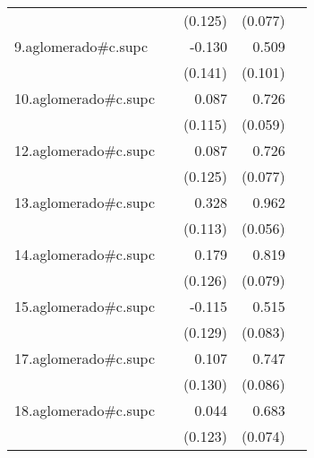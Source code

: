 {\begin{longtable}{l*{4}{D{.}{.}{-1}}}
            &                     &     (0.125)         &     (0.077)         &                     \\
\addlinespace
9.aglomerado#c.supc&                     &      -0.130         &       0.509\sym{***}&                     \\
            &                     &     (0.141)         &     (0.101)         &                     \\
\addlinespace
10.aglomerado#c.supc&                     &       0.087         &       0.726\sym{***}&                     \\
            &                     &     (0.115)         &     (0.059)         &                     \\
\addlinespace
12.aglomerado#c.supc&                     &       0.087         &       0.726\sym{***}&                     \\
            &                     &     (0.125)         &     (0.077)         &                     \\
\addlinespace
13.aglomerado#c.supc&                     &       0.328\sym{**} &       0.962\sym{***}&                     \\
            &                     &     (0.113)         &     (0.056)         &                     \\
\addlinespace
14.aglomerado#c.supc&                     &       0.179         &       0.819\sym{***}&                     \\
            &                     &     (0.126)         &     (0.079)         &                     \\
\addlinespace
15.aglomerado#c.supc&                     &      -0.115         &       0.515\sym{***}&                     \\
            &                     &     (0.129)         &     (0.083)         &                     \\
\addlinespace
17.aglomerado#c.supc&                     &       0.107         &       0.747\sym{***}&                     \\
            &                     &     (0.130)         &     (0.086)         &                     \\
\addlinespace
18.aglomerado#c.supc&                     &       0.044         &       0.683\sym{***}&                     \\
            &                     &     (0.123)         &     (0.074)         &                     \\

\end{longtable}}
